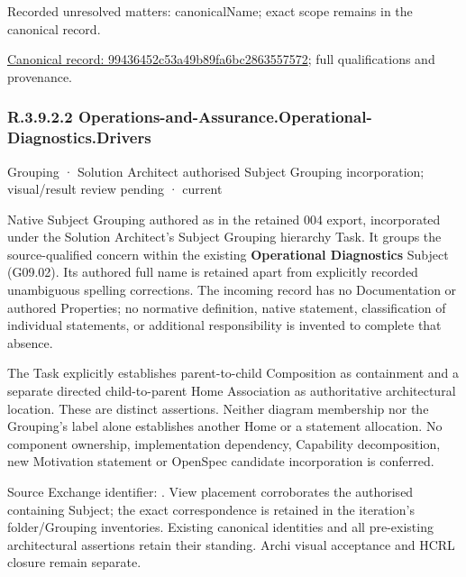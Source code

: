 {\small Recorded unresolved matters: canonicalName; exact scope remains in the canonical record.}\par
{\footnotesize \href{../../../../continuum/grouping/99436452c53a49b89fa6bc2863557572.md}{Canonical record: 99436452c53a49b89fa6bc2863557572}; full qualifications and provenance.}\par
\subsubsection*{R.3.9.2.2 Operations-and-Assurance.Operational-Diagnostics.Drivers}
\label{navigation:R.3.9.2.2}

\label{element:805280b737e14b72ba401393c1f4a271}
{\small Grouping · Solution Architect authorised Subject Grouping incorporation; visual/result review pending · current}\par

Native Subject Grouping authored as \texttt{} in the retained 004 export,
incorporated under the Solution Architect's Subject Grouping hierarchy Task.
It groups the source-qualified \texttt{} concern within
the existing \textbf{Operational Diagnostics} Subject (G09.02). Its authored full name
is retained apart from explicitly recorded unambiguous spelling corrections.
The incoming record has no Documentation or authored Properties; no normative
definition, native statement, classification of individual statements, or
additional responsibility is invented to complete that absence.



The Task explicitly establishes parent-to-child Composition as containment and
a separate directed child-to-parent Home Association as authoritative architectural
location. These are distinct assertions. Neither diagram membership nor the
Grouping's label alone establishes another Home or a statement allocation.
No component ownership, implementation dependency, Capability decomposition,
new Motivation statement or OpenSpec candidate incorporation is conferred.



Source Exchange identifier: \texttt{}. View placement corroborates
the authorised containing Subject; the exact correspondence is retained in the
iteration's folder/Grouping inventories. Existing canonical identities and all
pre-existing architectural assertions retain their standing. Archi visual
acceptance and HCRL closure remain separate.


